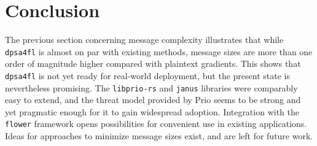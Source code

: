 \documentclass{article}
\begin{document}



\section{Conclusion}
The previous section concerning message complexity illustrates that while
\texttt{dpsa4fl} is almost on par with existing methods, message sizes are more
than one order of magnitude higher compared with plaintext gradients.
This shows that \texttt{dpsa4fl} is not yet ready for real-world deployment, but
the present state is nevertheless promising. The \texttt{libprio-rs} and \texttt{janus}
libraries were comparably easy to extend, and the threat model provided by Prio
seems to be strong and yet pragmatic enough for it to gain widespread adoption.
Integration with the \texttt{flower} framework opens possibilities for convenient
use in existing applications. Ideas for approaches to minimize message sizes
exist, and are left for future work.



\end{document}
